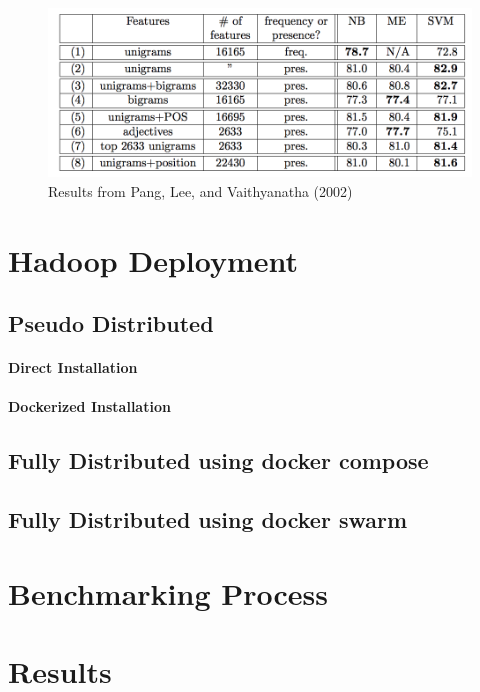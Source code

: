 \begin{figure}[!ht]
	\centering\includegraphics[width=\columnwidth]{images/pang-result.png}
        \caption{Results
	from Pang, Lee, and Vaithyanatha
	(2002)~\cite{hid-sp18-405-sentiment-pang2002thumbs}}\label{f:pang-result}
\end{figure}


\section{Hadoop Deployment}\label{s:hadoopdep}

\subsection{Pseudo Distributed}
\paragraph{Direct Installation}
\paragraph{Dockerized Installation}

\subsection{Fully Distributed using docker compose}


\subsection{Fully Distributed using docker swarm}


\section{Benchmarking Process}\label{s:benchrproc}


\section{Results}\label{s:results}


